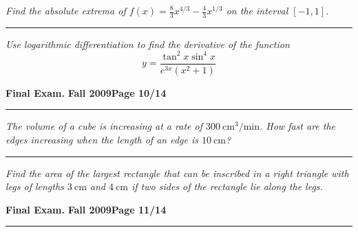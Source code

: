 \documentclass[12pt]{article}
\begin{document}
\bigskip
{\problem[10 pts] \em Find the absolute extrema of $f(x) = \frac{8}{3} x^{4/3} - \frac{4}{3} x^{1/3}$ on the interval $[-1,1]$.}
\vspace{6cm}
\begin{flushright}
\end{flushright}
\hrule
{\problem[10 pts] \em Use logarithmic differentiation to find the
  derivative of the function 
\begin{equation*}
y=\frac{\tan^2 x \sin^4 x}{e^{3x}(x^2+1)}
\end{equation*}
\vspace{7cm}
\begin{flushright}
\end{flushright}
\newpage

\hfill{\large\bf Final Exam.}\hfill{\large\bf
  Fall 2009}\hfill{\large\bf Page 10/14}\hrule

\bigskip
{\problem[10 pts] \em The volume of a cube is increasing at a rate of
  $300~\text{cm}^3/\text{min}$.  How fast are the edges increasing
  when the length of an edge is $10~\text{cm}$?}
\vspace{6cm}
\begin{flushright}
\end{flushright}
\hrule
{\problem[20 pts] \em Find the area of the largest rectangle that can
  be inscribed in a right triangle with legs of lengths $3~\text{cm}$
  and $4~\text{cm}$ if two sides of the rectangle lie along the legs.}
\vspace{11cm}
\begin{flushright}
\end{flushright}
\hfill{\large\bf Final Exam.}\hfill{\large\bf
  Fall 2009}\hfill{\large\bf Page 11/14}\hrule

}
\end{document}
